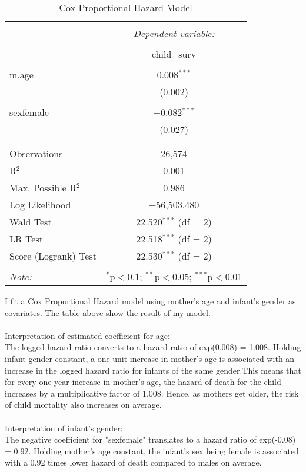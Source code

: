 \documentclass{article}
\begin{document}
\begin{table}[H] \centering 
  \caption{Cox Proportional Hazard Model} 
  \label{} 
\begin{tabular}{@{\extracolsep{5pt}}lc} 
\\[-1.8ex]\hline 
\hline \\[-1.8ex] 
 & \multicolumn{1}{c}{\textit{Dependent variable:}} \\ 
\cline{2-2} 
\\[-1.8ex] & child\_surv \\ 
\hline \\[-1.8ex] 
 m.age & 0.008$^{***}$ \\ 
  & (0.002) \\ 
  & \\ 
 sexfemale & $-$0.082$^{***}$ \\ 
  & (0.027) \\ 
  & \\ 
\hline \\[-1.8ex] 
Observations & 26,574 \\ 
R$^{2}$ & 0.001 \\ 
Max. Possible R$^{2}$ & 0.986 \\ 
Log Likelihood & $-$56,503.480 \\ 
Wald Test & 22.520$^{***}$ (df = 2) \\ 
LR Test & 22.518$^{***}$ (df = 2) \\ 
Score (Logrank) Test & 22.530$^{***}$ (df = 2) \\ 
\hline 
\hline \\[-1.8ex] 
\textit{Note:}  & \multicolumn{1}{r}{$^{*}$p$<$0.1; $^{**}$p$<$0.05; $^{***}$p$<$0.01} \\ 
\end{tabular} 
\end{table}


I fit a Cox  Proportional Hazard model using mother’s age and infant’s gender as covariates. The table above show the result of my model.
\\
\\
Interpretation of estimated coefficient for age:
\\
The logged hazard ratio converts to a hazard ratio of exp(0.008) = 1.008.
Holding infant gender constant, a one unit increase in mother's age is associated with an increase in the logged hazard ratio for infants of the same gender.This means that for every one-year increase in mother's age, the hazard of death for the child increases by a multiplicative factor of 1.008. Hence, as mothers get older, the risk of child mortality also increases on average.
\\
\\
Interpretation of infant's gender:
\\
The negative coefficient for "sexfemale" translates to a hazard ratio of exp(-0.08) = 0.92. 
Holding mother's age constant, the infant's sex being female is associated with a 0.92 times lower hazard of death compared to males on average. 
\end{document}
